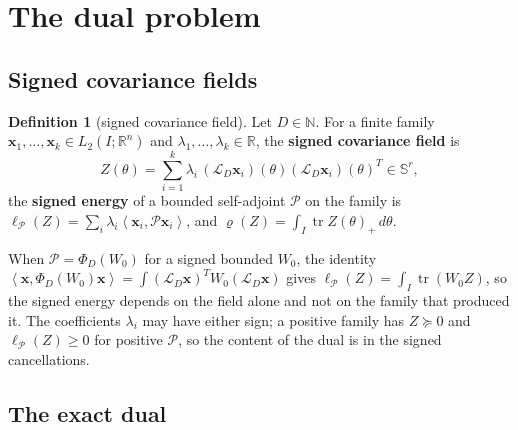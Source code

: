 \documentclass[12pt]{article}
\newcommand{\R}{\mathbb{R}}
\newcommand{\N}{\mathbb{N}}
\newcommand{\Sym}[1]{\mathbb{S}^{#1}}
\newcommand{\mcl}[1]{\mathcal{#1}}
\newcommand{\mbf}[1]{\mathbf{#1}}
\newcommand{\ip}[2]{\left\langle #1,#2\right\rangle}
\DeclareMathOperator{\tr}{tr}
\theoremstyle{plain}
\theoremstyle{definition}
\newtheorem{definition}[theorem]{Definition}
\theoremstyle{remark}
\begin{document}
\section{The dual problem}\label{sec:dual}

\subsection{Signed covariance fields}

\begin{definition}[signed covariance field]\label{def:field}
Let $D\in\N$. For a finite family $\mbf x_1,\dots,\mbf x_k\in L_2(I;\R^n)$ and $\lambda_1,\dots,\lambda_k\in\R$, the \textbf{signed covariance field} is
\[
Z(\theta)=\sum_{i=1}^k\lambda_i\,(\mcl L_D\mbf x_i)(\theta)(\mcl L_D\mbf x_i)(\theta)^T\in\Sym{r},
\]
the \textbf{signed energy} of a bounded self-adjoint $\mcl P$ on the family is $\ell_{\mcl P}(Z)=\sum_i\lambda_i\ip{\mbf x_i}{\mcl P\mbf x_i}$, and $\varrho(Z)=\int_I\tr Z(\theta)_+\,d\theta$.
\end{definition}

When $\mcl P=\Phi_D(W_0)$ for a signed bounded $W_0$, the identity $\ip{\mbf x}{\Phi_D(W_0)\mbf x}=\int(\mcl L_D\mbf x)^TW_0(\mcl L_D\mbf x)$ gives $\ell_{\mcl P}(Z)=\int_I\tr(W_0Z)$, so the signed energy depends on the field alone and not on the family that produced it. The coefficients $\lambda_i$ may have either sign; a positive family has $Z\succeq0$ and $\ell_{\mcl P}(Z)\ge0$ for positive $\mcl P$, so the content of the dual is in the signed cancellations.

\subsection{The exact dual}
\end{document}
